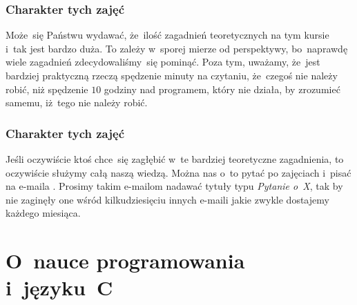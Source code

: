 \documentclass[10pt,t]{beamer}
\begin{document}
\begin{frame}
  \frametitle{Charakter tych zajęć}


  Może~się Państwu wydawać, że~ilość zagadnień teoretycznych na tym kursie
  i~tak jest bardzo duża. To zależy w~sporej mierze od perspektywy,
  bo~naprawdę wiele zagadnień zdecydowaliśmy~się pominąć. Poza tym,
  uważamy, że~jest bardziej praktyczną rzeczą spędzenie minuty na
  czytaniu, że~czegoś nie należy robić, niż spędzenie $10$ godziny nad
  programem, który nie działa, by zrozumieć samemu, iż~tego nie należy
  robić.

\end{frame}





\begin{frame}
  \frametitle{Charakter tych zajęć}




  Jeśli oczywiście ktoś chce~się zagłębić w~te bardziej teoretyczne
  zagadnienia, to oczywiście służymy całą naszą wiedzą. Można
  nas o~to pytać po zajęciach i~pisać na e-maila \email.
  Prosimy takim e-mailom nadawać tytuły typu \textit{Pytanie o~X}, tak by
  nie zaginęły one wśród kilkudziesięciu innych e-maili jakie zwykle
  dostajemy każdego miesiąca.

\end{frame}






























\section{O~nauce programowania i~języku~C}
\end{document}
